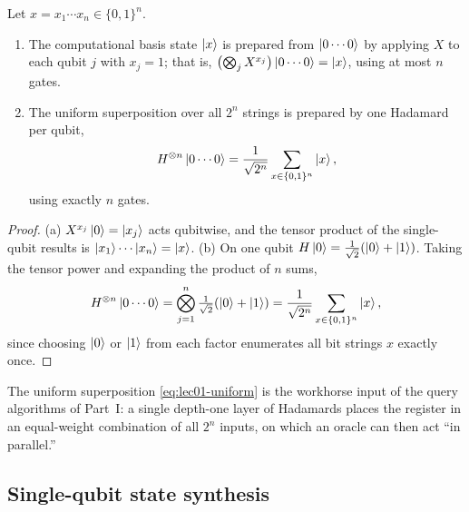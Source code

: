 \begin{proposition}\label{prop:lec01-prepbasic}
Let $x=x_{1}\cdots x_{n}\in\{0,1\}^{n}$.
\begin{enumerate}[label=\textup{(\alph*)}]
  \item The computational basis state $\ket{x}$ is prepared from $\ket{0\cdots0}$ by
        applying $X$ to each qubit $j$ with $x_{j}=1$; that is,
        $\bigl(\bigotimes_{j}X^{x_{j}}\bigr)\ket{0\cdots0}=\ket{x}$, using at most
        $n$ gates.
  \item The uniform superposition over all $2^{n}$ strings is prepared by one
        Hadamard per qubit,
        \begin{equation}\label{eq:lec01-uniform}
          H^{\otimes n}\ket{0\cdots0}
            =\frac{1}{\sqrt{2^{n}}}\sum_{x\in\{0,1\}^{n}}\ket{x},
        \end{equation}
        using exactly $n$ gates.
\end{enumerate}
\end{proposition}

\begin{proof}
(a) $X^{x_{j}}\ket{0}=\ket{x_{j}}$ acts qubitwise, and the tensor product of the
single-qubit results is $\ket{x_{1}}\cdots\ket{x_{n}}=\ket{x}$.
(b) On one qubit $H\ket{0}=\tfrac{1}{\sqrt2}(\ket{0}+\ket{1})$. Taking the tensor
power and expanding the product of $n$ sums,
\[
  H^{\otimes n}\ket{0\cdots0}
    =\bigotimes_{j=1}^{n}\tfrac{1}{\sqrt2}(\ket{0}+\ket{1})
    =\frac{1}{\sqrt{2^{n}}}\sum_{x\in\{0,1\}^{n}}\ket{x},
\]
since choosing $\ket{0}$ or $\ket{1}$ from each factor enumerates all bit strings $x$
exactly once.
\end{proof}

The uniform superposition \eqref{eq:lec01-uniform} is the workhorse input of the
query algorithms of Part~I: a single depth-one layer of Hadamards places the register
in an equal-weight combination of all $2^{n}$ inputs, on which an oracle can then act
``in parallel.''

\subsection{Single-qubit state synthesis}

